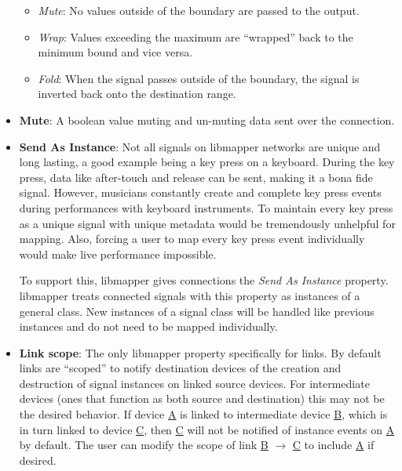 \begin{itemize}
\begin{itemize}
		\item\emph{Mute}: No values outside of the boundary are passed to the output.
		\item\emph{Wrap}: Values exceeding the maximum are ``wrapped'' back to the minimum bound and vice versa.
		\item\emph{Fold}: When the signal passes outside of the boundary, the signal is inverted back onto the destination range. 
	\end{itemize}
	\item\textbf{Mute}: A boolean value muting and un-muting data sent over the connection.
	\item\textbf{Send As Instance}: Not all signals on libmapper networks are unique and long lasting, a good example being a key press on a keyboard. During the key press, data like after-touch and release can be sent, making it a bona fide signal. However, musicians constantly create and complete key press events during performances with keyboard instruments. To maintain every key press as a unique signal with unique metadata would be tremendously unhelpful for mapping. Also, forcing a user to map every key press event individually would make live performance impossible.

	To support this, libmapper gives connections the \emph{Send As Instance} property. libmapper treats connected signals with this property as instances of a general class. New instances of a signal class will be handled like previous instances and do not need to be mapped individually.
	\item\textbf{Link scope}: The only libmapper property specifically for links. By default links are ``scoped'' to notify destination devices of the creation and destruction of signal instances on linked source devices. For intermediate devices (ones that function as both source and destination) this may not be the desired behavior. If device \url{A} is linked to intermediate device \url{B}, which is in turn linked to device \url{C}, then \url{C} will not be notified of instance events on \url{A} by default. The user can modify the scope of link \url{B} $\rightarrow$ \url{C} to include \url{A} if desired.

\end{itemize}


